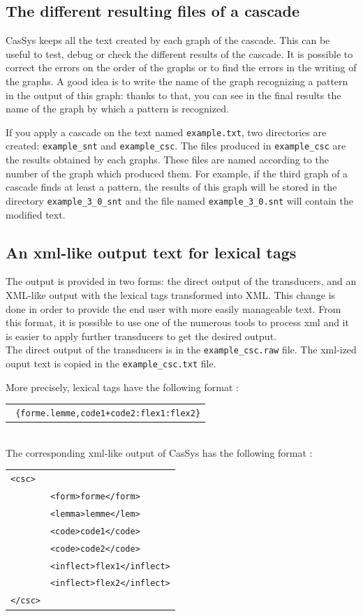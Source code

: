 \subsection{The different resulting files of a cascade}

CasSys keeps all the text created by each graph of the cascade. This can be useful to test, debug or check the different results of the cascade. It is possible to correct the errors on the order of the graphs or to find the errors in the writing of the graphs. A good idea is to write the name of the graph recognizing a pattern in the output of this graph: thanks to that, you can see in the final results the name of the graph by which a pattern is recognized. 
\bigskip

If you apply a cascade on the text named \texttt{example.txt}, two directories are created: \texttt{example\_snt} and \texttt{example\_csc}.
The files produced in \texttt{example\_csc} are the results obtained by each graphs. These files are named according to the number of the graph which produced them. For example, if the third graph of a cascade finds at least a pattern, the results of this graph will be stored in the directory  \texttt{example\_3\_0\_snt} and the file named \texttt{example\_3\_0.snt} will contain the modified text.

\subsection{An xml-like output text for lexical tags}

The output is provided in two forms: the direct output of the transducers, and an XML-like output with the lexical tags transformed into XML. This change is done in order to provide the end user with more easily manageable text. 
From this format, it is possible to use one of the numerous tools to process xml and it is easier to apply further transducers to get the desired output.\\
The direct output of the transducers is in the \texttt{example\_csc.raw} file. The xml-ized ouput text is copied in the \texttt{example\_csc.txt} file.

More precisely, lexical tags have the following format :\\
\begin{tabular}{c}
\texttt{
\{forme.lemme,code1+code2:flex1:flex2\}}
\end{tabular}\\
The corresponding xml-like output of CasSys has the following format :\\
\begin{tabular}{ll}
\texttt{<csc>}&\\
	&\texttt{<form>forme</form>}\\
	&\texttt{<lemma>lemme</lem>}\\
	&\texttt{<code>code1</code>}\\
	&\texttt{<code>code2</code>}\\
	&\texttt{<inflect>flex1</inflect>}\\
	&\texttt{<inflect>flex2</inflect>}\\
\texttt{</csc>}&\\
\end{tabular}


